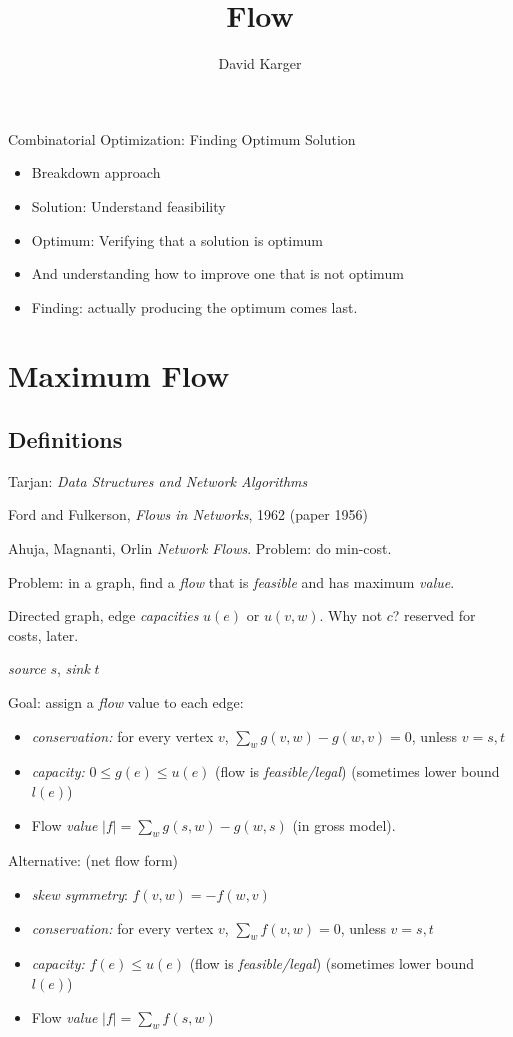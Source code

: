 \documentclass{article}
\title{Flow}
\author{David Karger}
\begin{document}

Combinatorial Optimization: Finding Optimum Solution
\begin{itemize}
\item Breakdown approach
\item Solution: Understand feasibility
\item Optimum: Verifying that a solution is optimum
\item And understanding how to improve one that is not optimum
\item Finding: actually producing the optimum comes last.
\end{itemize}

\section{Maximum Flow}

\subsection{Definitions}

Tarjan: \emph{Data Structures and Network Algorithms}

Ford and Fulkerson, \emph{Flows in Networks}, 1962 (paper 1956)

Ahuja, Magnanti, Orlin \emph{Network Flows}.  Problem: do min-cost.

Problem: in a graph, find a \emph{flow} that is \emph{feasible} and has
maximum \emph{value}.

Directed graph, edge \emph{capacities} $u(e)$ or $u(v,w)$.  Why not
$c$? reserved for costs, later.

\emph{source} $s$, \emph{sink} $t$

Goal: assign a \emph{flow} value to each edge:
\begin{itemize}
\item \emph{conservation:} for every vertex $v$, $\sum_w g(v,w)-g(w,v)=0$, unless $v=s,t$
\item \emph{capacity:} $0 \le g(e) \le u(e)$ (flow is {\em
    feasible/legal}) (sometimes lower bound $l(e)$)
\item Flow \emph{value} $|f| = \sum_w g(s,w)-g(w,s)$ (in gross model).
\end{itemize}

Alternative: (net flow form)
\begin{itemize}
\item \emph{skew symmetry}: $f(v,w) = -f(w,v)$
\item \emph{conservation:} for every vertex $v$, $\sum_w f(v,w)=0$, unless $v=s,t$
\item \emph{capacity:} $f(e) \le u(e)$ (flow is {\em
    feasible/legal}) (sometimes lower bound $l(e)$)
\item Flow \emph{value} $|f| = \sum_w f(s,w)$
\end{itemize}
\end{document}
